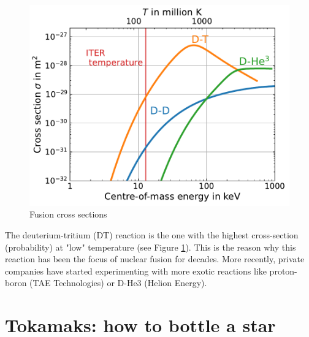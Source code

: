 \begin{figure} [h]
    \centering
    \includegraphics[width=\linewidth]{Figures/Chapter1/cross_sections_vs_temperature__Bosch.pdf}
    \caption{Fusion cross sections}
    \label{fig: fusion cross sections}
\end{figure}

The deuterium-tritium (DT) reaction is the one with the highest cross-section (probability) at "low" temperature (see Figure \ref{fig: fusion cross sections}).
This is the reason why this reaction has been the focus of nuclear fusion for decades.
More recently, private companies have started experimenting with more exotic reactions like proton-boron (TAE Technologies) or D-He3 (Helion Energy).


\section{Tokamaks: how to bottle a star}

